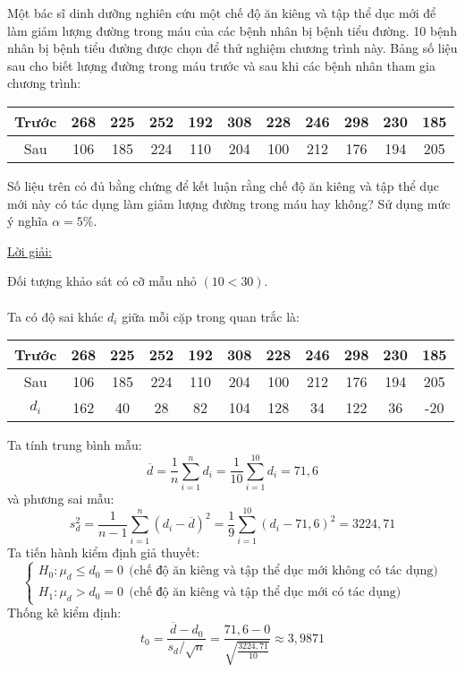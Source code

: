\documentclass[10pt, a4paper]{article}
\begin{document}
\begin{tcolorbox}[enhanced,colback=blue!5!white,colframe=blue!75!black,sharp corners=all,shadow={0mm}{0mm}{-1.5mm}%
{fill=blue!75!red,opacity=0.3},title=\textbf{Bài 4}]
Một bác sĩ dinh dưỡng nghiên cứu một chế độ ăn kiêng và tập thể dục mới để làm giảm lượng đường trong máu của các bệnh nhân bị bệnh tiểu đường. 10 bệnh nhân bị bệnh tiểu đường được chọn để thử nghiệm chương trình này. Bảng số liệu sau cho biết lượng đường trong máu trước và sau khi các bệnh nhân tham gia chương trình:\begin{center}
\begin{tabular}{c|cccccccccc}
	Trước&268&225&252&192&308&228&246&298&230&185\\ \hline
	Sau&106&185&224&110&204&100&212&176&194&205
\end{tabular}
\end{center}
Số liệu trên có đủ bằng chứng để kết luận rằng chế độ ăn kiêng và tập thể dục mới này có tác dụng làm giảm lượng đường trong máu hay không? Sử dụng mức ý nghĩa $\alpha=5\%$.
\end{tcolorbox}
\begin{center}
	\color{blue}\underline{Lời giải:}
\end{center}
Đối tượng khảo sát có cỡ mẫu nhỏ $(10<30)$.\\\\
Ta có độ sai khác $d_i$ giữa mỗi cặp trong quan trắc là: \begin{center}
\begin{tabular}{c|cccccccccc}
	Trước&268&225&252&192&308&228&246&298&230&185\\ \hline
	Sau&106&185&224&110&204&100&212&176&194&205\\ \hline
	$d_i$&162&40&28&82&104&128&34&122&36&-20
\end{tabular}
\end{center}
Ta tính trung bình mẫu: $$\overline d=\frac{1}{n}\sum_{i=1}^nd_i=\frac{1}{10}\sum_{i=1}^{10}d_i=71,6$$
và phương sai mẫu: $$s_d^2=\frac{1}{n-1}\sum_{i=1}^n(d_i-\overline d)^2=\frac19\sum_{i=1}^{10}(d_i-71,6)^2=3224,71$$
Ta tiến hành kiểm định giả thuyết: $$\begin{cases}
H_0:\mu_d\le d_0=0~~\text{(chế độ ăn kiêng và tập thể dục mới không có tác dụng)}\\
H_1:\mu_d>d_0=0~~\text{(chế độ ăn kiêng và tập thể dục mới có tác dụng)}
\end{cases}$$
Thống kê kiểm định: $$t_0=\frac{\overline d-d_0}{s_d/\sqrt n}=\frac{71,6-0}{\sqrt{\frac{3224,71}{10}}}\approx3,9871$$
\end{document}
